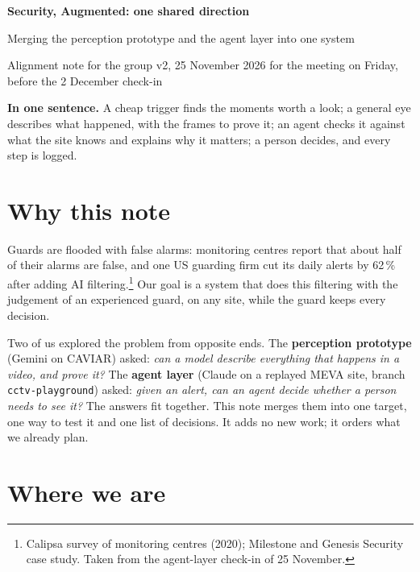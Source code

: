 \documentclass[11pt,a4paper]{article}
\begin{document}
{\color{navy}\Huge\bfseries Security, Augmented: one shared direction\par}
\vspace{0.3em}
{\Large Merging the perception prototype and the agent layer into one system\par}
\vspace{0.3em}
{\color{gray}Alignment note for the group \textperiodcentered{} v2, 25 November 2026 \textperiodcentered{} for the meeting on Friday, before the 2 December check-in\par}
\vspace{0.8em}

\begin{keybox}
\textbf{In one sentence.} A cheap trigger finds the moments worth a look; a general eye describes what
happened, with the frames to prove it; an agent checks it against what the site knows and explains why it
matters; a person decides, and every step is logged.
\end{keybox}

\section{Why this note}
Guards are flooded with false alarms: monitoring centres report that about half of their alarms are false,
and one US guarding firm cut its daily alerts by 62\,\% after adding AI filtering.\footnote{Calipsa survey of
monitoring centres (2020); Milestone and Genesis Security case study. Taken from the agent-layer check-in of
25 November.} Our goal is a system that does this filtering with the judgement of an experienced guard, on any
site, while the guard keeps every decision.

Two of us explored the problem from opposite ends. The \textbf{perception prototype} (Gemini on CAVIAR) asked:
\emph{can a model describe everything that happens in a video, and prove it?} The \textbf{agent layer}
(Claude on a replayed MEVA site, branch \texttt{cctv-playground}) asked: \emph{given an alert, can an agent decide
whether a person needs to see it?} The answers fit together. This note merges them into one target, one way to
test it and one list of decisions. It adds no new work; it orders what we already plan.

\section{Where we are}
\end{document}
